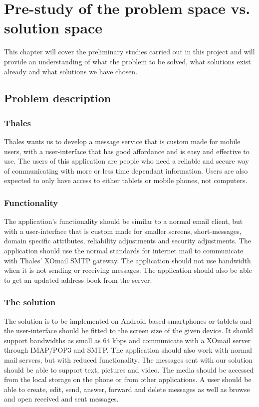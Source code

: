 \chapter{Pre-study of the problem space vs. solution space}
This chapter will cover the preliminary studies carried out in this project and will provide an understanding of what the problem to be solved, what solutions exist already and what solutions we have chosen.

\section{Problem description}

\subsection{Thales}
Thales wants us to develop a message service that is custom made for mobile users, with a user-interface that has good affordance and is easy and effective to use.
\newline
\newline
The users of this application are people who need a reliable and secure way of communicating with more or less time dependant information. Users are also expected to only have access to either tablets or mobile phones, not computers.

\subsection{Functionality}
The application’s functionality should be similar to a normal email client, but with a user-interface that is custom made for smaller screens, short-messages, domain specific attributes, reliability adjustments and security adjustments. The application should use the normal standards for internet mail to communicate with Thales’ XOmail SMTP gateway.
\newline
\newline
The application should not use bandwidth when it is not sending or receiving messages. The application should also be able to get an updated address book from the server.

\subsection{The solution}
The solution is to be implemented on Android based smartphones or tablets and the user-interface should be fitted to the screen size of the given device. It should support bandwidths as small as 64 kbps and communicate with a XOmail
server through IMAP/POP3 and SMTP. The application should also work with normal mail servers, but with reduced functionality.
\newline
\newline
The messages sent with our solution should be able to support text, pictures and video. The media should be accessed from the local storage on the phone or from other applications. A user should be able to create, edit, send, answer, forward and delete messages as well as browse and open received and sent messages.

